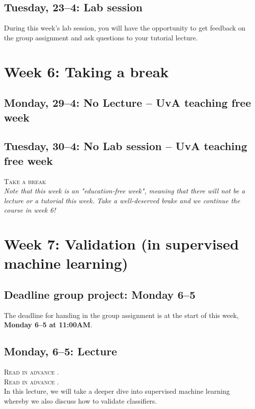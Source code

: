 \subsection*{Tuesday, 23--4: Lab session}
During this week's lab session, you will have the opportunity to get feedback on the group assignment and ask questions to your tutorial lecture. 

\section*{Week 6: Taking a break}

\subsection*{Monday, 29--4: No Lecture -- UvA teaching free week}
\subsection*{Tuesday, 30--4: No Lab session -- UvA teaching free week}

\textsc{ Take a break}\\

\emph{Note that this week is an "education-free week", meaning that there will not be a lecture or a tutorial this week. Take a well-deserved brake and we continue the course in week 6!}

\section*{Week 7: Validation (in supervised machine learning)}

\subsection*{Deadline group project: Monday 6--5}
The deadline for handing in the group assignment is at the start of this week, \textbf{Monday 6--5 at 11:00AM}.

\subsection*{Monday, 6--5: Lecture}
\textsc{ Read in advance \cite{hube_understanding_2019}.} \\
\textsc{ Read in advance \cite{birkenmaier_search_2023}.}\\

In this lecture, we will take a deeper dive into supervised machine learning whereby we also discuss how to validate classifiers.

